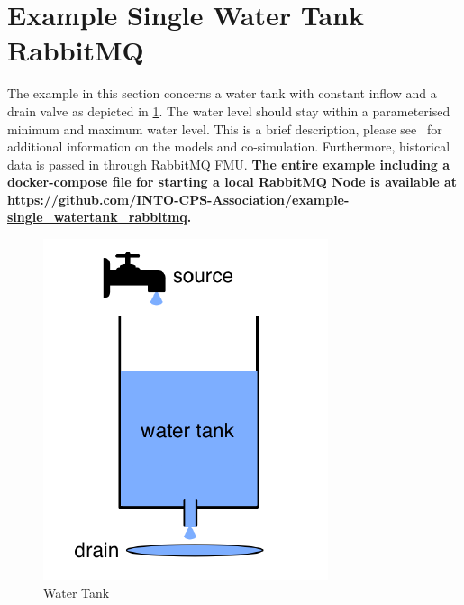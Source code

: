 \section{Example Single Water Tank RabbitMQ}\label{sec:example}
The example in this section concerns a water tank with constant inflow and a
drain valve as depicted in \cref{fig:water-tank-picture}. The water level should
stay within a parameterised minimum and maximum water level. This is a brief
description, please see~\cite{INTOCPSD3.6} for additional information on
the models and co-simulation. Furthermore, historical data is passed in through
RabbitMQ FMU. \textbf{The entire example including a docker-compose file for
  starting a local RabbitMQ Node is available at \url{https://github.com/INTO-CPS-Association/example-single_watertank_rabbitmq}.}
\begin{figure}[!htb]
  \centering
  \includegraphics[]{figures/water-tank-picture.png}
  \caption{Water Tank}
  \label{fig:water-tank-picture}
\end{figure}


